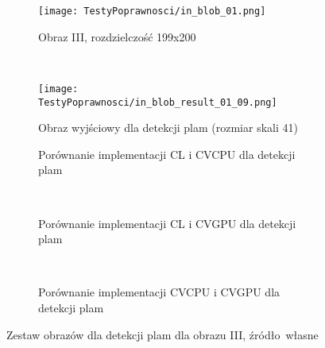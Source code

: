 \begin{figure}[h]

\begin{center}
\begin{subfigure}[t]{0.3\textwidth}
\texttt{[image: TestyPoprawnosci/in\_blob\_01.png]}
\caption{Obraz III, rozdzielczość 199x200}
\label{fig:valBlob01}
\end{subfigure}
~
\begin{subfigure}[t]{0.3\textwidth}
\texttt{[image: TestyPoprawnosci/in\_blob\_result\_01\_09.png]}
\caption{Obraz wyjściowy dla detekcji plam (rozmiar skali 41)}
\label{fig:valBlobResult01}
\end{subfigure}
\end{center}


\begin{subfigure}[t]{0.3\textwidth}
	\centering
	\setlength\fboxsep{0pt}
	\setlength\fboxrule{0.5pt}
	\caption{Porównanie implementacji CL i CVCPU dla detekcji plam}
	\label{fig:valBlob2CLCVCPU}
\end{subfigure}
~
\begin{subfigure}[t]{0.3\textwidth}
	\centering
	\setlength\fboxsep{0pt}
	\setlength\fboxrule{0.5pt}
	\caption{Porównanie implementacji CL i CVGPU dla detekcji plam}
	\label{fig:valBlob2CLCVGPU}
\end{subfigure}
~
\begin{subfigure}[t]{0.3\textwidth}
	\centering
	\setlength\fboxsep{0pt}
	\setlength\fboxrule{0.5pt}
	\caption{Porównanie implementacji CVCPU i CVGPU dla detekcji plam}
	\label{fig:valblob2CVCPUCVGPU}                 
\end{subfigure}
\caption{Zestaw obrazów dla detekcji plam dla obrazu III, \tiny{źródło~własne}}

\label{fig:valBlob1}
\end{figure}

